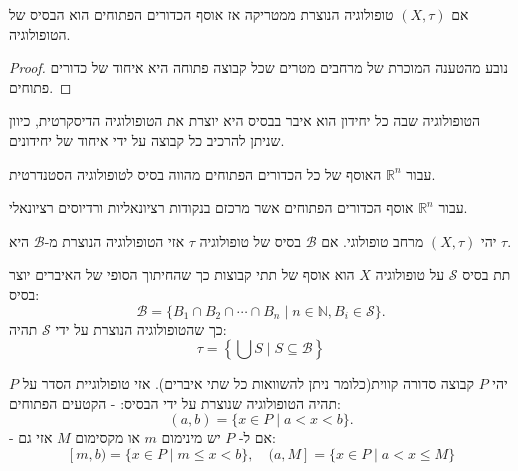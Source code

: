 \documentclass{tstextbook}
\begin{document}
\begin{proposition}
אם \(\left( X,\tau \right)\) טופולוגיה הנוצרת ממטריקה אז אוסף הכדורים הפתוחים הוא הבסיס של הטופולוגיה.

\end{proposition}
\begin{proof}
נובע מהטענה המוכרת של מרחבים מטרים שכל קבוצה פתוחה היא איחוד של כדורים פתוחים.

\end{proof}
\begin{example}
הטופולוגיה שבה כל יחידון הוא איבר בבסיס היא יוצרת את הטופולוגיה הדיסקרטית, כיוון שניתן להרכיב כל קבוצה על ידי איחוד של יחידונים.

\end{example}
\begin{example}
עבור \(\mathbb{R}^{n}\) האוסף של כל הכדורים הפתוחים מהווה בסיס לטופולוגיה הסטנדרטית.

\end{example}
\begin{example}
עבור \(\mathbb{R}^{n}\) אוסף הכדורים הפתוחים אשר מרכזם בנקודות רציונאליות ורדיוסים רציונאלי.

\end{example}
\begin{proposition}
יהי \(\left( X,\tau \right)\) מרחב טופולוגי. אם \(\mathcal{B}\) בסיס של טופולוגיה \(\tau\) אזי הטופולוגיה הנוצרת מ-\(\mathcal{B}\) היא \(\tau\).

\end{proposition}
\begin{definition}[תת בסיס]
תת בסיס \(\mathcal{S}\) על טופולוגיה \(X\) הוא אוסף של תתי קבוצות כך שהחיתוך הסופי של האיברים יוצר בסיס:
$${\mathcal{B}}=\{B_{1}\cap B_{2}\cap\cdots\cap B_{n}\mid n\in\mathbb{N},B_{i}\in{\mathcal{S}}\}.$$
כך שהטופולוגיה הנוצרת על ידי \(\mathcal{S}\) תהיה:
$$\tau=\left\{\bigcup S\mid S\subseteq\mathcal{B}\right\}$$

\end{definition}
\begin{definition}
יהי \(P\) קבוצה סדורה קווית(כלומר ניתן להשוואות כל שתי איברים). אזי טופולוגיית הסדר על \(P\) תהיה הטופולוגיה שנוצרת על ידי הבסיס:
- הקטעים הפתוחים:
$$(a,b)=\{x\in P\mid a<x<b\}.$$
- אם ל- \(P\) יש מינימום \(m\) או מקסימום \(M\) אזי גם:
$$[m,b)=\{x\in P\mid m\leq x<b\},\quad(a,M]=\{x\in P\mid a<x\leq M\}$$

\end{definition}
\end{document}
